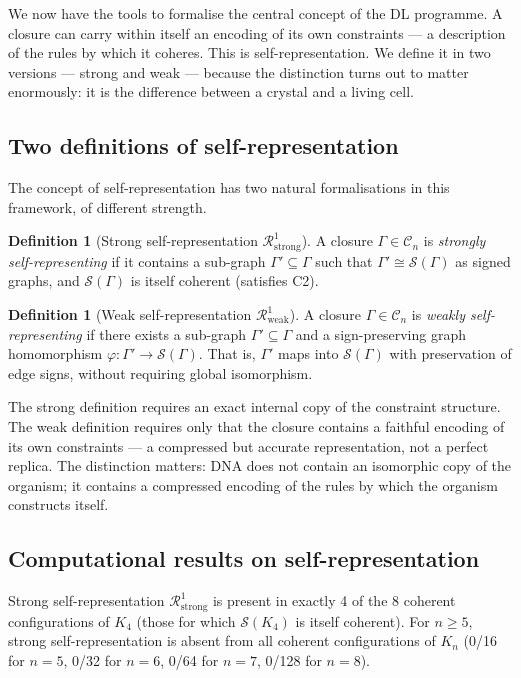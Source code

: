 \documentclass[12pt,a4paper]{article}
\theoremstyle{plain}
\theoremstyle{definition}
\newtheorem{definition}[theorem]{Definition}
\theoremstyle{remark}
\newenvironment{computedresult}[1][]{%
  \begin{tcolorbox}[computedstyle,title={Computational Result\ifx\relax#1\relax\else: #1\fi}]}{\end{tcolorbox}}
\newcommand{\Kfour}{K_4}
\newcommand{\Calg}{\mathcal{C}}
\newcommand{\Sop}{\mathcal{S}}
\newcommand{\Rop}{\mathcal{R}}
\begin{document}
We now have the tools to formalise the central concept of the DL programme. A closure
can carry within itself an encoding of its own constraints --- a description of the
rules by which it coheres. This is self-representation. We define it in two versions
--- strong and weak --- because the distinction turns out to matter enormously: it
is the difference between a crystal and a living cell.

\subsection{Two definitions of self-representation}

The concept of self-representation has two natural formalisations in this framework,
of different strength.

\begin{definition}[Strong self-representation $\Rop^1_{\mathrm{strong}}$]
A closure $\Gamma \in \Calg_n$ is \emph{strongly self-representing} if it contains a
sub-graph $\Gamma' \subseteq \Gamma$ such that $\Gamma' \cong \Sop(\Gamma)$ as signed
graphs, and $\Sop(\Gamma)$ is itself coherent (satisfies C2).
\end{definition}

\begin{definition}[Weak self-representation $\Rop^1_{\mathrm{weak}}$]
A closure $\Gamma \in \Calg_n$ is \emph{weakly self-representing} if there exists a
sub-graph $\Gamma' \subseteq \Gamma$ and a sign-preserving graph homomorphism
$\varphi: \Gamma' \to \Sop(\Gamma)$. That is, $\Gamma'$ maps into $\Sop(\Gamma)$
with preservation of edge signs, without requiring global isomorphism.
\end{definition}

The strong definition requires an exact internal copy of the constraint structure.
The weak definition requires only that the closure contains a faithful encoding of
its own constraints --- a compressed but accurate representation, not a perfect
replica. The distinction matters: DNA does not contain an isomorphic copy of the
organism; it contains a compressed encoding of the rules by which the organism
constructs itself.

\subsection{Computational results on self-representation}

\begin{computedresult}[Strong self-representation --- Script~1 and 4]
Strong self-representation $\Rop^1_{\mathrm{strong}}$ is present in exactly 4 of
the 8 coherent configurations of $\Kfour$ (those for which $\Sop(\Kfour)$ is
itself coherent). For $n \geq 5$, strong self-representation is absent from all
coherent configurations of $K_n$ (0/16 for $n=5$, 0/32 for $n=6$, 0/64 for $n=7$,
0/128 for $n=8$).
\end{computedresult}
\end{document}
